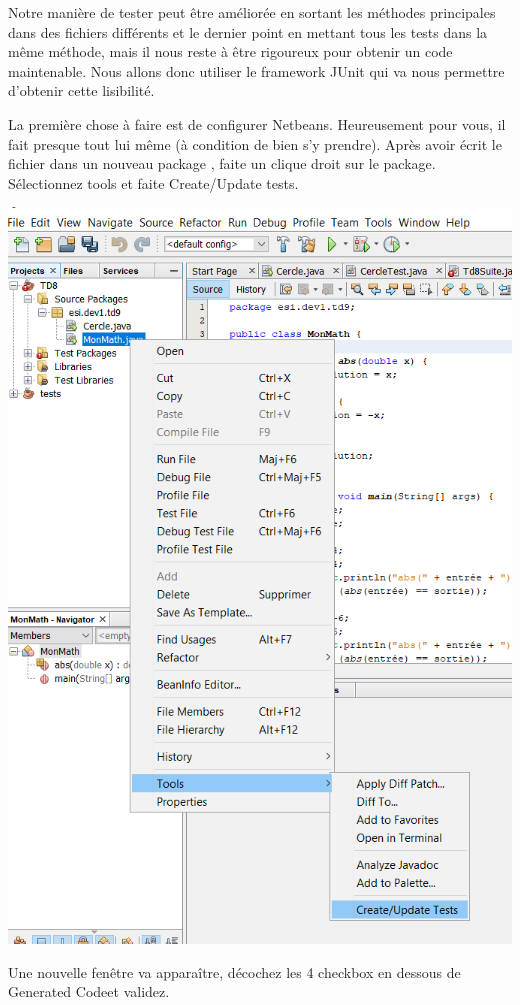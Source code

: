 \documentclass[a4paper,11pt]{article}
\begin{document}
	Notre manière de tester peut être améliorée en sortant les méthodes principales dans des fichiers différents et le dernier point en mettant tous les tests dans la même méthode, mais il nous reste à être rigoureux pour obtenir un code maintenable. Nous allons donc utiliser le framework JUnit qui va nous permettre d'obtenir cette lisibilité.

	La première chose à faire est de configurer Netbeans. Heureusement pour vous, il fait presque tout lui même (à condition de bien s’y prendre).
	Après avoir écrit le fichier  dans un nouveau package , faite un clique droit sur le package. Sélectionnez tools et faite Create/Update tests.

	\begin{center}
		\includegraphics[width=.7\textwidth]{images/create_tests.png}
	\end{center}


	Une nouvelle fenêtre va apparaître, décochez les 4 checkbox en dessous de \og Generated Code\fg et validez. 
\end{document}
